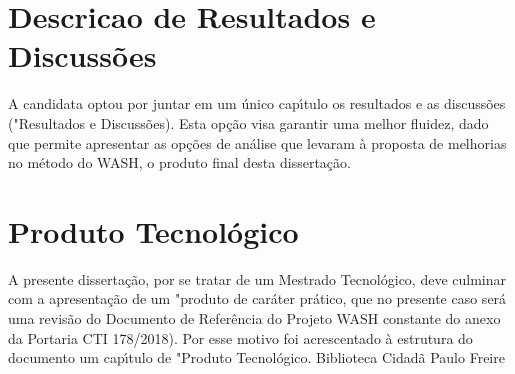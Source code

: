 \documentclass[
12pt,		%
openright,	%
twoside,  %
a4paper,			%
chapter=TITLE,		%
english,			%
french,				%
spanish,			%
brazil				%
]{USPSC-classe/USPSC}
\begin{document}
\section[Descricao de Resultados e Discuss\~oes]{Descricao de Resultados e Discuss\~oes}\label{Descricao de Resultados e Discuss\~oes}
A candidata optou por juntar em um \'unico cap\'{\i}tulo os resultados e as discuss\~oes ("Resultados e Discuss\~oes). Esta op\c{c}\~ao visa garantir uma melhor fluidez, dado que permite apresentar as op\c{c}\~oes de an\'alise que levaram \`a proposta de melhorias no m\'etodo do WASH, o produto final desta disserta\c{c}\~ao. 
\section[Produto Tecnol\'ogico]{Produto Tecnol\'ogico}\label{Produto Tecnol\'ogico}
A presente disserta\c{c}\~ao, por se tratar de um Mestrado Tecnol\'ogico, deve culminar com a apresenta\c{c}\~ao de um "produto de car\'ater pr\'atico, que no presente caso ser\'a uma revis\~ao do Documento de Refer\^encia do Projeto WASH  constante do anexo da  Portaria CTI 178/2018). Por esse motivo foi acrescentado \`a estrutura do documento um cap\'{\i}tulo de "Produto Tecnol\'ogico. Biblioteca Cidad\~a Paulo Freire
\end{document}
